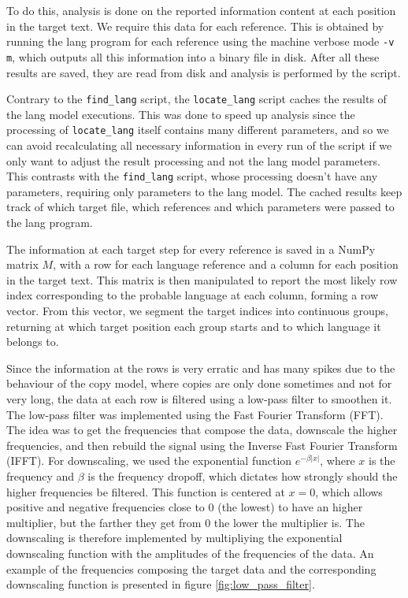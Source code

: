 \documentclass{article}
\begin{document}
To do this, analysis is done on the reported information content at each position in the target text.
We require this data for each reference.
This is obtained by running the lang program for each reference using the machine verbose mode \verb|-v m|, which outputs all this information into a binary file in disk.
After all these results are saved, they are read from disk and analysis is performed by the script.

Contrary to the \verb|find_lang| script, the \verb|locate_lang| script caches the results of the lang model executions.
This was done to speed up analysis since the processing of \verb|locate_lang| itself contains many different parameters, and so we can avoid recalculating all necessary information in every run of the script if we only want to adjust the result processing and not the lang model parameters.
This contrasts with the \verb|find_lang| script, whose processing doesn't have any parameters, requiring only parameters to the lang model.
The cached results keep track of which target file, which references and which parameters were passed to the lang program.

The information at each target step for every reference is saved in a NumPy matrix $M$, with a row for each language reference and a column for each position in the target text.
This matrix is then manipulated to report the most likely row index corresponding to the probable language at each column, forming a row vector.
From this vector, we segment the target indices into continuous groups, returning at which target position each group starts and to which language it belongs to.

Since the information at the rows is very erratic and has many spikes due to the behaviour of the copy model, where copies are only done sometimes and not for very long, the data at each row is filtered using a low-pass filter to smoothen it.
The low-pass filter was implemented using the Fast Fourier Transform (FFT).
The idea was to get the frequencies that compose the data, downscale the higher frequencies, and then rebuild the signal using the Inverse Fast Fourier Transform (IFFT).
For downscaling, we used the exponential function $e^{-\beta|x|}$, where $x$ is the frequency and $\beta$ is the frequency dropoff, which dictates how strongly should the higher frequencies be filtered.
This function is centered at $x=0$, which allows positive and negative frequencies close to 0 (the lowest) to have an higher multiplier, but the farther they get from 0 the lower the multiplier is.
The downscaling is therefore implemented by multipliying the exponential downscaling function with the amplitudes of the frequencies of the data.
An example of the frequencies composing the target data and the corresponding downscaling function is presented in figure \ref{fig:low_pass_filter}.
\end{document}
